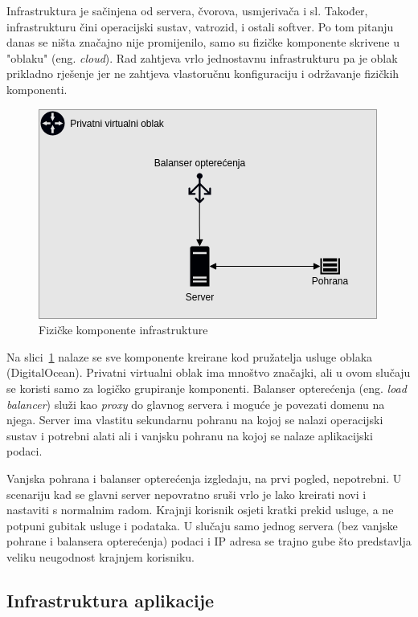 Infrastruktura je sačinjena od servera, čvorova, usmjerivača i sl.
Također, infrastrukturu čini operacijski sustav, vatrozid, i ostali softver\cite{ibm-infrastructure}.
Po tom pitanju danas se ništa značajno nije promijenilo, samo su fizičke komponente skrivene u "oblaku" (eng. \textit{cloud}).
Rad zahtjeva vrlo jednostavnu infrastrukturu pa je oblak prikladno rješenje jer ne zahtjeva vlastoručnu konfiguraciju i održavanje fizičkih komponenti.

\begin{figure}[h!]
    \centering
    \includegraphics[scale=0.7]{images/infrastructure}
    \caption{Fizičke komponente infrastrukture}
    \label{fig:physical-infrastructure}
\end{figure}

Na slici~\ref{fig:physical-infrastructure} nalaze se sve komponente kreirane kod pružatelja usluge oblaka (DigitalOcean).
Privatni virtualni oblak ima mnoštvo značajki, ali u ovom slučaju se koristi samo za logičko grupiranje komponenti.
Balanser opterećenja (eng. \textit{load balancer}) služi kao \textit{proxy} do glavnog servera i moguće je povezati domenu na njega.
Server ima vlastitu sekundarnu pohranu na kojoj se nalazi operacijski sustav i potrebni alati ali i vanjsku pohranu na kojoj se nalaze aplikacijski podaci.

Vanjska pohrana i balanser opterećenja izgledaju, na prvi pogled, nepotrebni.
U scenariju kad se glavni server nepovratno sruši vrlo je lako kreirati novi i nastaviti s normalnim radom.
Krajnji korisnik osjeti kratki prekid usluge, a ne potpuni gubitak usluge i podataka.
U slučaju samo jednog servera (bez vanjske pohrane i balansera opterećenja) podaci i IP adresa se trajno gube što predstavlja veliku
neugodnost krajnjem korisniku.

\subsection{Infrastruktura aplikacije}

